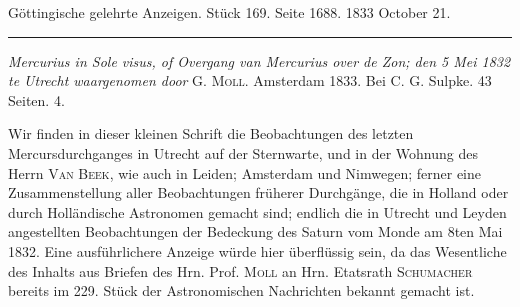 \clearpage
{}
\hypertarget{native-653-lower}{}
\begin{center}\small Göttingische gelehrte Anzeigen. Stück 169. Seite 1688. 1833 October 21.\\[3pt]\rule{.72\linewidth}{.3pt}\end{center}

\emph{Mercurius in Sole visus, of Overgang van Mercurius over de Zon; den 5 Mei \textup{1832} te Utrecht waargenomen door} G. \textsc{Moll}. Amsterdam 1833. Bei C. G. Sulpke. 43 Seiten. 4.

Wir finden in dieser kleinen Schrift die Beobachtungen des letzten Mercursdurchganges in Utrecht auf der Sternwarte, und in der Wohnung des Herrn \textsc{Van Beek}, wie auch in Leiden; Amsterdam und Nimwegen; ferner eine Zusammenstellung aller Beobachtungen früherer Durchgänge, die in Holland oder durch Holländische Astronomen gemacht sind; endlich die in Utrecht und Leyden angestellten Beobachtungen der Bedeckung des Saturn vom Monde am 8ten Mai 1832. Eine ausführlichere Anzeige würde hier überflüssig sein, da das Wesentliche des Inhalts aus Briefen des Hrn. Prof. \textsc{Moll} an Hrn. Etatsrath \textsc{Schumacher} bereits im 229. Stück der Astronomischen Nachrichten bekannt gemacht ist.
